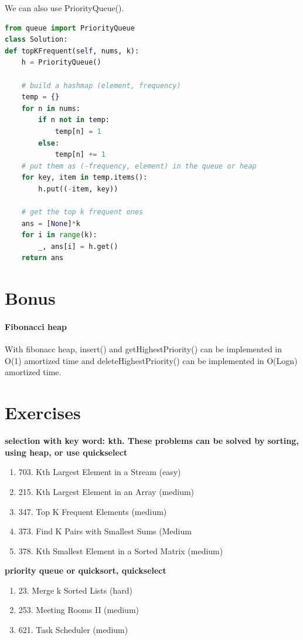 \documentclass[main.tex]{subfiles}
\begin{document}
We can also use PriorityQueue(). 
\begin{lstlisting}[language=Python]
from queue import PriorityQueue
class Solution:
def topKFrequent(self, nums, k):
    h = PriorityQueue()
    
    # build a hashmap (element, frequency)
    temp = {}
    for n in nums:
        if n not in temp:
            temp[n] = 1
        else:
            temp[n] += 1
    # put them as (-frequency, element) in the queue or heap
    for key, item in temp.items():
        h.put((-item, key))
    
    # get the top k frequent ones
    ans = [None]*k
    for i in range(k):
        _, ans[i] = h.get()
    return ans
\end{lstlisting}

\section{Bonus}
\label{heap_sec_bonus}
\paragraph{Fibonacci heap} With fibonacc heap, insert() and getHighestPriority() can be implemented in O(1) amortized time and deleteHighestPriority() can be implemented in O(Logn) amortized time.
\section{Exercises}

\textbf{selection with key word: kth. These problems can be solved by sorting, using heap, or use quickselect}
\begin{enumerate}
\item 703. Kth Largest Element in a Stream (easy)
    \item 215. Kth Largest Element in an Array (medium)
    \item 	347. Top K Frequent Elements (medium)
    \item 373. Find K Pairs with Smallest Sums (Medium	
	\item 378. Kth Smallest Element in a Sorted Matrix (medium)
\end{enumerate}
\textbf{priority queue or quicksort, quickselect}
\begin{enumerate}
    \item 23. Merge k Sorted Lists (hard)
    \item 253. Meeting Rooms II (medium)
    \item 621. Task Scheduler (medium)
\end{enumerate}
\end{document}
